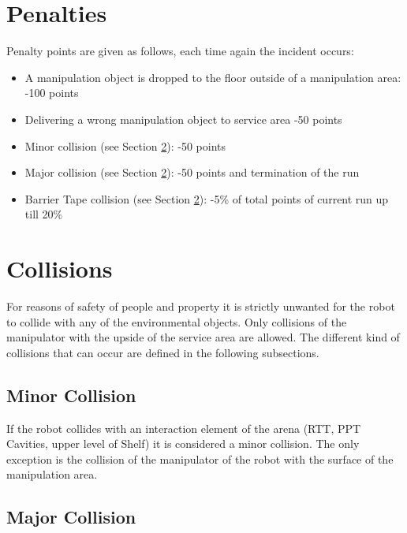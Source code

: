 \section{Penalties}
\label{sec:penalties}
Penalty points are given as follows, each time again the incident occurs:

\begin{itemize}
	\item A manipulation object is dropped to the floor outside of a manipulation area: \hfill -100 points
	\item Delivering a wrong manipulation object to service area \hfill -50 points
	\item Minor collision (see Section \ref{sec:Collisions}): \hfill -50 points
	\item Major collision (see Section \ref{sec:Collisions}): \hfill -50 points and termination of the run
  \item Barrier Tape collision (see Section \ref{sec:Collisions}): \hfill -5\% of total points of current run up till
  20\%
\end{itemize}

\section{Collisions}\label{sec:Collisions}


For reasons of safety of people and property it is strictly unwanted for the robot to collide with any of the
environmental objects. Only collisions of the manipulator with the upside of the service area are allowed. The
different kind of collisions that can occur are defined in the following subsections.

\subsection{Minor Collision}

If the robot collides with an interaction element of the arena (RTT, PPT Cavities, upper level of Shelf) it is
considered a minor collision. The only exception is the collision of the manipulator of the robot with the surface of
the manipulation area.

\subsection{Major Collision}

